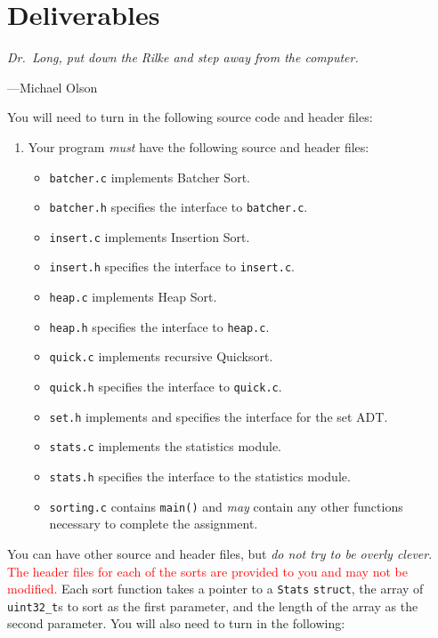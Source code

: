 \section{Deliverables}

\epigraph{\emph{Dr.\ Long, put down the Rilke and step away from the
computer.}}{---Michael Olson}

You will need to turn in the following source code and header files:

\begin{enumerate}
  \item Your program \emph{must} have the following source and header
    files:
  \begin{itemize}
    \item \texttt{batcher.c} implements Batcher Sort.
    \item \texttt{batcher.h} specifies the interface to \texttt{batcher.c}.
    \item \texttt{insert.c} implements Insertion Sort.
    \item \texttt{insert.h} specifies the interface to \texttt{insert.c}.
    \item \texttt{heap.c} implements Heap Sort.
    \item \texttt{heap.h} specifies the interface to \texttt{heap.c}.
    \item \texttt{quick.c} implements recursive Quicksort.
    \item \texttt{quick.h} specifies the interface to \texttt{quick.c}.
    \item \texttt{set.h} implements and specifies the interface for the
      set ADT.
    \item \texttt{stats.c} implements the statistics module.
    \item \texttt{stats.h} specifies the interface to the statistics
      module.
    \item \texttt{sorting.c} contains \texttt{main()} and \emph{may}
      contain any other functions necessary to complete the assignment.
  \end{itemize}
\end{enumerate}

You can have other source and header files, but \emph{do not try to be
overly clever}. \textcolor{red}{The header files for each of the sorts
are provided to you and may not be modified.} Each sort function takes a
pointer to a \texttt{Stats} \texttt{struct}, the array of
\texttt{uint32\_t}s to sort as the first parameter, and the length of
the array as the second parameter. You will also need to turn in the
following:

